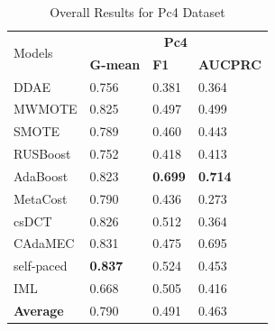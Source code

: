\begin{table}[h]
    \centering
    \begin{tabular}{|p{}<{\centering}|p{}<{\centering}|p{}<{\centering}|p{}<{\centering}|}
    \hline
    \multirow{2}{*}{Models} & \multicolumn{3}{c|}{\textbf{Pc4}}    \\ \cline{2-4} 
                             & \textbf{G-mean} & \textbf{F1} & \textbf{AUCPRC} \\ \hline
    DDAE                     &0.756	&0.381	&0.364            \\ \hline
    MWMOTE                   &0.825	&0.497	&0.499            \\ \hline
    SMOTE                    &0.789	&0.460	&0.443               \\ \hline
    RUSBoost                 &0.752	&0.418	&0.413           \\ \hline
    AdaBoost                 &0.823	&\textbf{0.699}	&\textbf{0.714}           \\ \hline
    MetaCost                 &0.790	&0.436	&0.273            \\ \hline
    csDCT                    &0.826	&0.512	&0.364             \\ \hline
    CAdaMEC                  &0.831	&0.475	&0.695             \\ \hline
    self-paced               &\textbf{0.837}	&0.524	&0.453            \\ \hline
    IML                      &0.668	&0.505	&0.416          \\ \hline\hline
    \textbf{Average}         &0.790	&0.491	&0.463             \\ \hline
    \end{tabular}
    \vspace{-8pt}
    \caption{Overall Results for Pc4 Dataset}
    \label{tab22}
\end{table}
